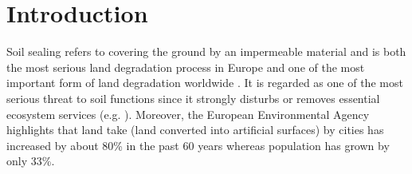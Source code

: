 \documentclass[APA,LATO1COL,doublespace]{WileyNJD-v2}
\newcommand{\toberevised}[1]{\emph{\textcolor{red}{#1}}} %
\begin{document}
\maketitle


\section{Introduction}\label{sec1}
Soil sealing refers to covering the ground by an impermeable material and is both the most serious land degradation process in Europe and one of the most important form of land degradation worldwide \citep{FAO15}.
It is regarded as one of the most serious threat to soil functions since it strongly disturbs or removes essential ecosystem services (e.g. \citealp{Calzolari16,Dunbar13}).
Moreover, the European Environmental Agency \citep{EEA2011} highlights that land take (land converted into artificial surfaces) by cities has increased by about 80\% in the past 60 years whereas population has grown by only 33\%.
\end{document}
